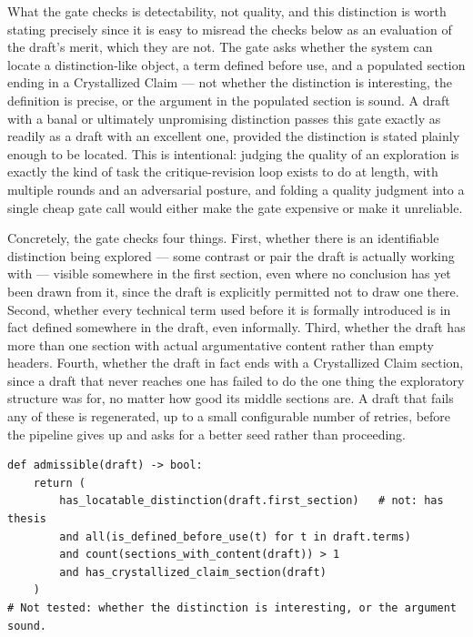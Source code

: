 \documentclass[11pt]{article}
\theoremstyle{definition}
\begin{document}
What the gate checks is detectability, not quality, and this
distinction is worth stating precisely since it is easy to misread the
checks below as an evaluation of the draft's merit, which they are not.
The gate asks whether the system can locate a distinction-like object,
a term defined before use, and a populated section ending in a
Crystallized Claim --- not whether the distinction is interesting, the
definition is precise, or the argument in the populated section is
sound. A draft with a banal or ultimately unpromising distinction
passes this gate exactly as readily as a draft with an excellent one,
provided the distinction is stated plainly enough to be located. This
is intentional: judging the quality of an exploration is exactly the
kind of task the critique-revision loop exists to do at length, with
multiple rounds and an adversarial posture, and folding a quality
judgment into a single cheap gate call would either make the gate
expensive or make it unreliable.

Concretely, the gate checks four things. First, whether there is an
identifiable distinction being explored --- some contrast or pair the
draft is actually working with --- visible somewhere in the first
section, even where no conclusion has yet been drawn from it, since the
draft is explicitly permitted not to draw one there. Second, whether
every technical term used before it is formally introduced is in fact
defined somewhere in the draft, even informally. Third, whether the
draft has more than one section with actual argumentative content
rather than empty headers. Fourth, whether the draft in fact ends with
a Crystallized Claim section, since a draft that never reaches one has
failed to do the one thing the exploratory structure was for, no
matter how good its middle sections are. A draft that fails any of
these is regenerated, up to a small configurable number of retries,
before the pipeline gives up and asks for a better seed rather than
proceeding.

\begin{lstlisting}[caption={The admissibility check, stated as a predicate}]
def admissible(draft) -> bool:
    return (
        has_locatable_distinction(draft.first_section)   # not: has thesis
        and all(is_defined_before_use(t) for t in draft.terms)
        and count(sections_with_content(draft)) > 1
        and has_crystallized_claim_section(draft)
    )
# Not tested: whether the distinction is interesting, or the argument sound.
\end{lstlisting}
\end{document}
